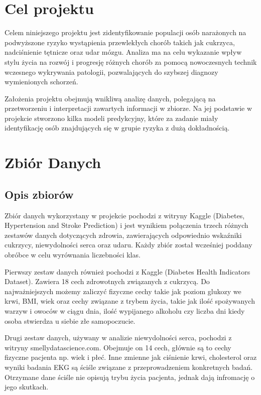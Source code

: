 \documentclass[onecolumn,12pt]{article}
\begin{document}
\section{Cel projektu}

Celem niniejszego projektu jest zidentyfikowanie populacji osób narażonych na podwyższone ryzyko
wystąpienia przewlekłych chorób takich jak cukrzyca, nadciśnienie tętnicze oraz udar mózgu. Analiza ma na celu wykazanie wpływ stylu życia na rozwój i progresję różnych chorób za pomocą nowoczesnych technik wczesnego wykrywania patologii, pozwalających do szybszej diagnozy wymienionych schorzeń.

Założenia projektu obejmują wnikliwą analizę danych, polegającą na przetworzeniu i interpretacji zawartych informacji w zbiorze. Na jej podstawie w projekcie stworzono kilka modeli predykcyjny, które za zadanie miały identyfikację osób znajdujących się w grupie ryzyka z dużą dokładnością.
        
\section{Zbiór Danych}

\subsection{Opis zbiorów}
Zbiór danych wykorzystany w projekcie pochodzi z witryny Kaggle (Diabetes, Hypertension and Stroke Prediction) i jest wynikiem połączenia trzech różnych zestawów danych dotyczących zdrowia, zawierających odpowiednio wskaźniki cukrzycy, niewydolności serca oraz udaru. Każdy zbiór został wcześniej poddany obróbce w celu wyrównania liczebności klas. 

Pierwszy zestaw danych również pochodzi z Kaggle (Diabetes Health Indicators Dataset). Zawiera 18 cech zdrowotnych związanych z cukrzycą. Do najważniejszych możemy zaliczyć fizyczne cechy takie jak poziom glukozy we krwi, BMI, wiek oraz cechy związane z trybem życia, takie jak ilość spożywanych warzyw i owoców w ciągu dnia, ilość wypijanego alkoholu czy liczba dni kiedy osoba stwierdza u siebie złe samopoczucie. 

Drugi zestaw danych, używany w analizie niewydolności serca, pochodzi z witryny smellydatascience.com. Obejmuje on 14 cech,  głównie są to cechy fizyczne pacjenta np. wiek i płeć. Inne zmienne jak ciśnienie krwi, cholesterol oraz wyniki badania EKG są ściśle związane z przeprowadzeniem konkretnych badań. Otrzymane dane ściśle nie opisują trybu życia pacjenta, jednak dają infromację o jego skutkach. 
\end{document}
